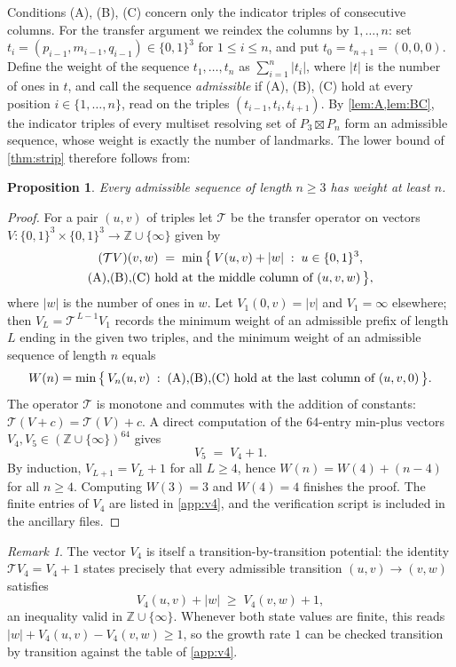 \documentclass[11pt]{amsart}
\newtheorem{proposition}[proposition]{Proposition}
\theoremstyle{remark}
\newtheorem{remark}[remark]{Remark}
\begin{document}
Conditions (A), (B), (C) concern only the indicator triples of consecutive columns.  For the transfer argument we reindex the columns by $1,\dots,n$: set $t_i=(p_{i-1},m_{i-1},q_{i-1})\in\{0,1\}^3$ for $1\le i\le n$, and put $t_0=t_{n+1}=(0,0,0)$.  Define the weight of the sequence $t_1,\dots,t_n$ as $\sum_{i=1}^n|t_i|$, where $|t|$ is the number of ones in $t$, and call the sequence \emph{admissible} if (A), (B), (C) hold at every position $i\in\{1,\dots,n\}$, read on the triples $(t_{i-1},t_i,t_{i+1})$.  By \cref{lem:A,lem:BC}, the indicator triples of every multiset resolving set of $P_3\boxtimes P_n$ form an admissible sequence, whose weight is exactly the number of landmarks.  The lower bound of \cref{thm:strip} therefore follows from:

\begin{proposition}\label{prop:lb}
Every admissible sequence of length $n\ge 3$ has weight at least $n$.
\end{proposition}

\begin{proof}
For a pair $(u,v)$ of triples let $\mathcal T$ be the transfer operator on vectors $V:\{0,1\}^3\times\{0,1\}^3\to\mathbb Z\cup\{\infty\}$ given by
\begin{multline*}
 (\mathcal T V)(v,w)\;=\;\min\big\{\,V(u,v)+|w| \;:\; u\in\{0,1\}^3,\\
 \textup{(A),(B),(C) hold at the middle column of }(u,v,w)\,\big\},
\end{multline*}
where $|w|$ is the number of ones in $w$.  Let $V_1(0,v)=|v|$ and $V_1=\infty$ elsewhere; then $V_L=\mathcal T^{\,L-1}V_1$ records the minimum weight of an admissible prefix of length $L$ ending in the given two triples, and the minimum weight of an admissible sequence of length $n$ equals
\[
 W(n)=\min\big\{\,V_n(u,v)\;:\;\textup{(A),(B),(C) hold at the last column of }(u,v,0)\,\big\}.
\]
The operator $\mathcal T$ is monotone and commutes with the addition of constants: $\mathcal T(V+c)=\mathcal T(V)+c$.  A direct computation of the $64$-entry min-plus vectors $V_4,V_5\in(\mathbb Z\cup\{\infty\})^{64}$ gives
\[
 V_5\;=\;V_4+1 .
\]
By induction, $V_{L+1}=V_L+1$ for all $L\ge 4$, hence $W(n)=W(4)+(n-4)$ for all $n\ge 4$.  Computing $W(3)=3$ and $W(4)=4$ finishes the proof.  The finite entries of $V_4$ are listed in \cref{app:v4}, and the verification script is included in the ancillary files.
\end{proof}

\begin{remark}\label{rem:potential}
The vector $V_4$ is itself a transition-by-transition potential: the identity $\mathcal T V_4=V_4+1$ states precisely that every admissible transition $(u,v)\to(v,w)$ satisfies
\[
 V_4(u,v)+|w|\;\ge\;V_4(v,w)+1,
\]
an inequality valid in $\mathbb Z\cup\{\infty\}$.  Whenever both state values are finite, this reads $|w|+V_4(u,v)-V_4(v,w)\ge 1$, so the growth rate $1$ can be checked transition by transition against the table of \cref{app:v4}.
\end{remark}
\end{document}

